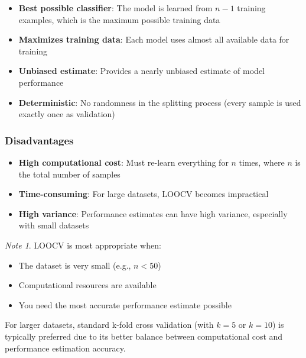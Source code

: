 \documentclass[11pt,a4paper]{article}
\theoremstyle{definition}
\theoremstyle{plain}
\theoremstyle{remark}
\newtheorem*{remark}{Note}
\begin{document}
\begin{itemize}
    \item \textbf{Best possible classifier}: The model is learned from $n-1$ training examples, which is the maximum possible training data
    
    \item \textbf{Maximizes training data}: Each model uses almost all available data for training
    
    \item \textbf{Unbiased estimate}: Provides a nearly unbiased estimate of model performance
    
    \item \textbf{Deterministic}: No randomness in the splitting process (every sample is used exactly once as validation)
\end{itemize}

\subsubsection{Disadvantages}

\begin{itemize}
    \item \textbf{High computational cost}: Must re-learn everything for $n$ times, where $n$ is the total number of samples
    
    \item \textbf{Time-consuming}: For large datasets, LOOCV becomes impractical
    
    \item \textbf{High variance}: Performance estimates can have high variance, especially with small datasets
\end{itemize}

\begin{remark}
LOOCV is most appropriate when:
\begin{itemize}
    \item The dataset is very small (e.g., $n < 50$)
    \item Computational resources are available
    \item You need the most accurate performance estimate possible
\end{itemize}

For larger datasets, standard k-fold cross validation (with $k = 5$ or $k = 10$) is typically preferred due to its better balance between computational cost and performance estimation accuracy.
\end{remark}
\end{document}
